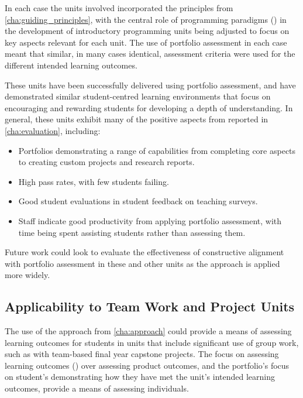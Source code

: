 In each case the units involved incorporated the principles from \cref{cha:guiding_principles}, with the central role of programming paradigms () in the development of introductory programming units being adjusted to focus on key aspects relevant for each unit. The use of portfolio assessment in each case meant that similar, in many cases identical, assessment criteria were used for the different intended learning outcomes.

These units have been successfully delivered using portfolio assessment, and have demonstrated similar student-centred learning environments that focus on encouraging and rewarding students for developing a depth of understanding. In general, these units exhibit many of the positive aspects from reported in \cref{cha:evaluation}, including:

\begin{itemize}[noitemsep,nolistsep]
	\item Portfolios demonstrating a range of capabilities from completing core aspects to creating custom projects and research reports.
	\item High pass rates, with few students failing.
	\item Good student evaluations in student feedback on teaching surveys.
	\item Staff indicate good productivity from applying portfolio assessment, with time being spent assisting students rather than assessing them.
\end{itemize}

Future work could look to evaluate the effectiveness of constructive alignment with portfolio assessment in these and other units as the approach is applied more widely.

\clearpage
\subsection{Applicability to Team Work and Project Units} %
\label{sub:applic}

The use of the approach from \cref{cha:approach} could provide a means of assessing learning outcomes for students in units that include significant use of group work, such as with team-based final year capstone projects. The focus on assessing learning outcomes () over assessing product outcomes, and the portfolio's focus on student's demonstrating how they have met the unit's intended learning outcomes, provide a means of assessing individuals.

